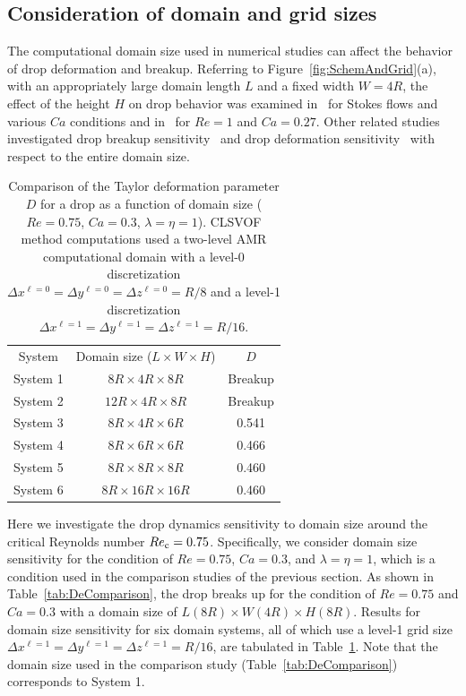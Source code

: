 \documentclass[%
 reprint,
 showkeys,
 amsmath,amssymb,
 aps,
 prfluids,
 onecolumn
]{revtex4-2}
\newcommand{\LWH}{L\times W \times H}
\newcommand{\lwh}[3]{L(#1R)\times W(#2R) \times H(#3R)}
\begin{document}
\subsection{Consideration of domain and grid sizes}\label{sec:DomGrdSize}
The computational domain size used in numerical studies can affect the behavior
of drop deformation and breakup.  Referring to
Figure~\ref{fig:SchemAndGrid}(a), with an appropriately large domain length $L$
and a fixed width $W=4R$, the effect of the height $H$ on drop behavior was
examined in~\cite{LiRenRen00} for Stokes flows and various $Ca$ conditions and
in~\cite{KomShaEskDer14} for $Re=1$ and $Ca=0.27$.  Other related studies
investigated drop breakup sensitivity~\cite{RenCri01-1} and drop deformation
sensitivity~\cite{RenCriLi02} with respect to the entire domain size.
%
\begin{table}[tbh]
\caption{Comparison of the Taylor deformation parameter {\color{red} $D$} for a drop as a function of
         domain size ($Re=0.75$, $Ca=0.3$, $\lambda = \eta = 1$).
         CLSVOF method computations used a two-level AMR computational domain 
         with a level-0 discretization $\Delta x^{\ell=0} = \Delta y^{\ell=0} 
         = \Delta z^{\ell=0} = R/8$ and a level-1 discretization
         $\Delta x^{\ell=1} = \Delta y^{\ell=1} = \Delta z^{\ell=1} = R/16$.}
\label{tab:DomComparison}
\center
\begin{tabular}{ c  c  c}
\hline
\hline
System      & Domain size ($\LWH$)         & {\color{red} $D$}    \\
System 1    & $8R  \times 4R  \times 8R$   & Breakup \\
System 2    & $12R \times 4R  \times 8R$   & Breakup \\
System 3    & $8R  \times 4R  \times 6R$   & 0.541   \\
System 4    & $8R  \times 6R  \times 6R$   & 0.466   \\
System 5    & $8R  \times 8R  \times 8R$   & 0.460   \\
System 6    & $8R  \times 16R \times 16R$  & 0.460   \\
\hline
\hline
\end{tabular}
\end{table}
%

Here we investigate the drop dynamics sensitivity to domain size around the
critical Reynolds number $Re_{\rm c}=0.75$.  Specifically, we consider domain size
sensitivity for the condition of $Re=0.75$, $Ca=0.3$, and $\lambda = \eta = 1$,
which is a condition used in the comparison studies of the previous section.
As shown in Table~\ref{tab:DeComparison}, the drop breaks up for the condition
of $Re=0.75$ and $Ca=0.3$ with a domain size of $\lwh{8}{4}{8}$.  Results for
domain size sensitivity for six domain systems, all of which use a level-1 grid
size $\Delta x^{\ell=1} = \Delta y^{\ell=1}= \Delta z^{\ell=1} = R/16$, are
tabulated in Table~\ref{tab:DomComparison}. Note that the domain size used in
the comparison study (Table~\ref{tab:DeComparison}) corresponds to System 1.
\end{document}
